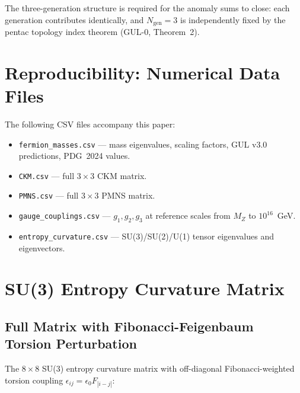 \documentclass[11pt]{article}
\begin{document}
The three-generation structure is required for the anomaly
sums to close: each generation contributes identically,
and $N_\text{gen}=3$ is independently fixed by the pentac
topology index theorem (GUL-0, Theorem~2).

\section{Reproducibility: Numerical Data Files}
\label{sec:data}

The following CSV files accompany this paper:

\begin{itemize}
  \item \texttt{fermion\_masses.csv} — mass eigenvalues, scaling
        factors, GUL v3.0 predictions, PDG~2024 values.
  \item \texttt{CKM.csv} — full $3\times3$ CKM matrix.
  \item \texttt{PMNS.csv} — full $3\times3$ PMNS matrix.
  \item \texttt{gauge\_couplings.csv} — $g_1,g_2,g_3$ at reference
        scales from $M_Z$ to $10^{16}$~GeV.
  \item \texttt{entropy\_curvature.csv} — SU(3)/SU(2)/U(1) tensor
        eigenvalues and eigenvectors.
\end{itemize}

\appendix

\section{SU(3) Entropy Curvature Matrix}
\label{app:su3}

\subsection{Full Matrix with Fibonacci-Feigenbaum Torsion Perturbation}

The $8\times8$ SU(3) entropy curvature matrix with off-diagonal
Fibonacci-weighted torsion coupling $\epsilon_{ij}=\epsilon_0 F_{|i-j|}$:
\end{document}
